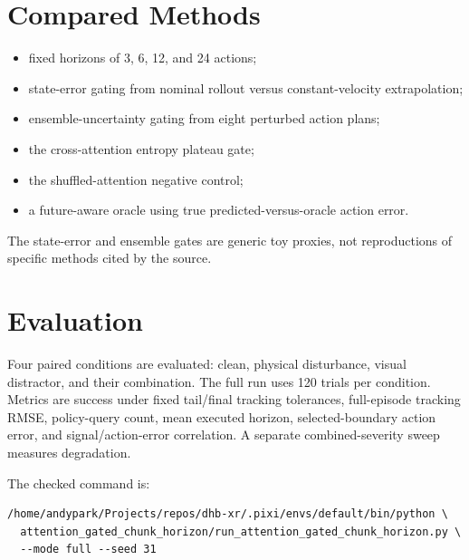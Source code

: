 \documentclass[11pt]{article}
\begin{document}
\section{Compared Methods}
\begin{itemize}[leftmargin=1.5em]
  \item fixed horizons of 3, 6, 12, and 24 actions;
  \item state-error gating from nominal rollout versus constant-velocity extrapolation;
  \item ensemble-uncertainty gating from eight perturbed action plans;
  \item the cross-attention entropy plateau gate;
  \item the shuffled-attention negative control;
  \item a future-aware oracle using true predicted-versus-oracle action error.
\end{itemize}
The state-error and ensemble gates are generic toy proxies, not reproductions of specific methods cited by the source.

\section{Evaluation}
Four paired conditions are evaluated: clean, physical disturbance, visual distractor, and their combination. The full run uses 120 trials per condition. Metrics are success under fixed tail/final tracking tolerances, full-episode tracking RMSE, policy-query count, mean executed horizon, selected-boundary action error, and signal/action-error correlation. A separate combined-severity sweep measures degradation.

The checked command is:
\begin{verbatim}
/home/andypark/Projects/repos/dhb-xr/.pixi/envs/default/bin/python \
  attention_gated_chunk_horizon/run_attention_gated_chunk_horizon.py \
  --mode full --seed 31
\end{verbatim}
\end{document}
